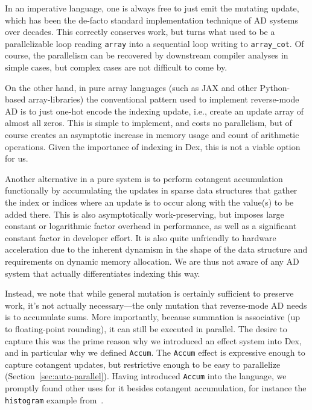 \documentclass[acmsmall,screen,nonacm]{acmart}
\begin{document}
In an imperative language, one is always free to just emit the mutating update, which has been the de-facto standard implementation technique of AD systems over decades.
This correctly conserves work, but turns what used to be a parallelizable loop reading \texttt{array} into a sequential loop writing to \verb|array_cot|.
Of course, the parallelism can be recovered by downstream compiler analyses in simple cases, but complex cases are not difficult to come by.

On the other hand, in pure array languages (such as JAX \cite{jax2018github} and other Python-based array-libraries) the conventional pattern used to implement reverse-mode AD is to just one-hot encode the indexing update, i.e., create an update array of almost all zeros.
This is simple to implement, and costs no parallelism, but of course creates an asymptotic increase in memory usage and count of arithmetic operations.
Given the importance of indexing in Dex, this is not a viable option for us.

Another alternative in a pure system is to perform cotangent accumulation functionally by accumulating the updates in sparse data structures that gather the index or indices where an update is to occur along with the value(s) to be added there.
This is also asymptotically work-preserving, but imposes large constant or logarithmic factor overhead in performance, as well as a significant constant factor in developer effort.
It is also quite unfriendly to hardware acceleration due to the inherent dynamism in the shape of the data structure and requirements on dynamic memory allocation.
We are thus not aware of any AD system that actually differentiates indexing this way.

Instead, we note that while general mutation is certainly sufficient to preserve work, it's not actually necessary---the only mutation that reverse-mode AD needs is to accumulate sums.
More importantly, because summation is associative (up to floating-point rounding), it can still be executed in parallel.
The desire to capture this was the prime reason why we introduced an effect system into Dex, and in particular why we defined \texttt{Accum}.
The \texttt{Accum} effect is expressive enough to capture cotangent updates, but restrictive enough to be easy to parallelize (Section~\ref{sec:auto-parallel}).
Having introduced \texttt{Accum} into the language, we promptly found other uses for it besides cotangent accumulation, for instance the \texttt{histogram} example from~.
\end{document}
